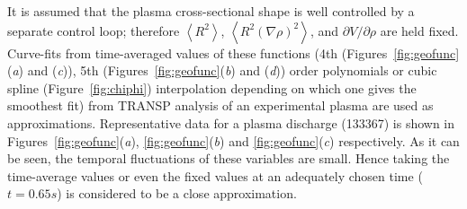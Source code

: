\documentclass[12pt,lot, lof]{puthesis}
\begin{document}
It is assumed that the plasma cross-sectional shape is well controlled by a
separate control loop; therefore $\left< R^2 \right>$, $\left< R^2
  (\nabla\rho)^2 \right>$, and $\partial V/\partial \rho$ are held fixed.
Curve-fits from time-averaged values of these functions (4th (Figures~\ref{fig:geofunc}(\emph{a}) and (\emph{c})), 5th (Figures~\ref{fig:geofunc}(\emph{b}) and (\emph{d})) order
polynomials or cubic spline (Figure~{\ref{fig:chiphi}}) interpolation depending on which one gives the smoothest fit) from TRANSP analysis of an experimental
plasma are used as approximations.
%
Representative data for a plasma discharge (133367) is shown in
Figures~\ref{fig:geofunc}(\emph{a}), \ref{fig:geofunc}(\emph{b}) and
\ref{fig:geofunc}(\emph{c}) respectively.  As it can be seen, the temporal
fluctuations of these variables are small. Hence taking the time-average values
or even the fixed values at an adequately chosen time ($t = 0.65 s$) is
considered to be a close approximation.
%
\end{document}
